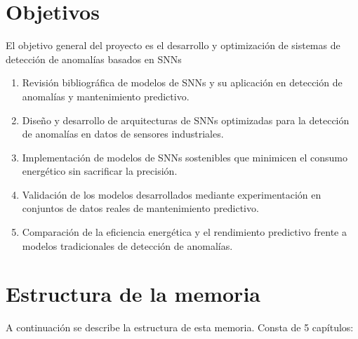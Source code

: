 \section{Objetivos}

El objetivo general del proyecto es el desarrollo y optimización de sistemas de detección de anomalías basados en SNNs

\begin{enumerate}
    \item Revisión bibliográfica de modelos de SNNs y su aplicación en detección de anomalías y mantenimiento predictivo.
    \item Diseño y desarrollo de arquitecturas de SNNs optimizadas para la detección de anomalías en datos de sensores industriales.
    \item Implementación de modelos de SNNs sostenibles que minimicen el consumo energético sin sacrificar la precisión.
    \item Validación de los modelos desarrollados mediante experimentación en conjuntos de datos reales de mantenimiento predictivo.
    \item Comparación de la eficiencia energética y el rendimiento predictivo frente a modelos tradicionales de detección de anomalías.
\end{enumerate}


\section{Estructura de la memoria}


A continuación se describe la estructura de esta memoria. Consta de 5 capítulos:

